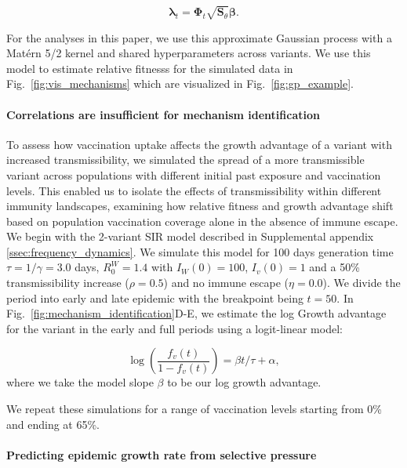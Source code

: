 \documentclass[11pt,oneside,letterpaper]{article}
\renewcommand{\vec}[1]{\boldsymbol{#1}}
\newcommand{\wt}{W}
\newcommand{\varEscape}{\eta}
\newcommand{\varTransmission}{\rho}
\begin{document}
\begin{equation*}
    \vec{\lambda}_{t} = \vec{\Phi}_{t} \sqrt{\vec{S}_{\theta}}\vec{\beta}.
\end{equation*}

For the analyses in this paper, we use this approximate Gaussian process with a Mat\'ern 5/2 kernel and shared hyperparameters across variants.
We use this model to estimate relative fitnesss for the simulated data in Fig.~\ref{fig:vis_mechanisms} which are visualized in Fig.~\ref{fig:gp_example}.

\paragraph{Correlations are insufficient for mechanism identification}


To assess how vaccination uptake affects the growth advantage of a variant with increased transmissibility, we simulated the spread of a more transmissible variant across populations with different initial past exposure and vaccination levels.
This enabled us to isolate the effects of transmissibility within different immunity landscapes, examining how relative fitness and growth advantage shift based on population vaccination coverage alone in the absence of immune escape.
We begin with the 2-variant SIR model described in Supplemental appendix \ref{ssec:frequency_dynamics}.
We simulate this model for 100 days generation time $\tau = 1 / \gamma = 3.0$ days, $R_{0}^{\wt} = 1.4$ with $I_{\wt}(0) = 100$, $I_v(0) = 1$ and a 50\% transmissibility increase ($\varTransmission=0.5$) and no immune escape ($\varEscape=0.0$).
We divide the period into early and late epidemic with the breakpoint being $t=50$.
In Fig.~\ref{fig:mechanism_identification}D-E, we estimate the log Growth advantage for the variant in the early and full periods using a logit-linear model:

\begin{equation*}
\log \left( \frac{f_v(t)}{1 - f_v(t)} \right) = \beta t / \tau + \alpha,
\end{equation*}
where we take the model slope $\beta$ to be our log growth advantage.

We repeat these simulations for a range of vaccination levels starting from 0\% and ending at 65\%.

\paragraph{Predicting epidemic growth rate from selective pressure}%
\end{document}

